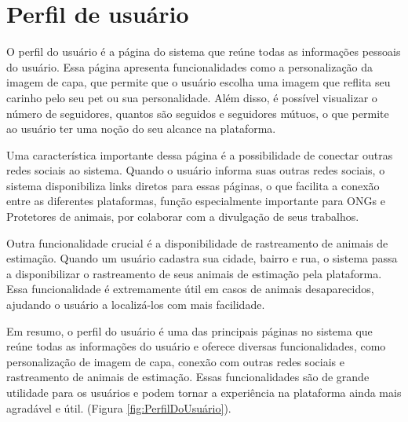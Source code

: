 \newpage
\section{Perfil de usuário}
\label{sec:PerfilDeUsuario}
O perfil do usuário é a página do sistema que reúne todas as informações pessoais do usuário. Essa página apresenta funcionalidades como a personalização da imagem de capa, que permite que o usuário escolha uma imagem que reflita seu carinho pelo seu pet ou sua personalidade. Além disso, é possível visualizar o número de seguidores, quantos são seguidos e seguidores mútuos, o que permite ao usuário ter uma noção do seu alcance na plataforma.

Uma característica importante dessa página é a possibilidade de conectar outras redes sociais ao sistema. Quando o usuário informa suas outras redes sociais, o sistema disponibiliza links diretos para essas páginas, o que facilita a conexão entre as diferentes plataformas, função especialmente importante para ONGs e Protetores de animais, por colaborar com a divulgação de seus trabalhos.

Outra funcionalidade crucial é a disponibilidade de rastreamento de animais de estimação. Quando um usuário cadastra sua cidade, bairro e rua, o sistema passa a disponibilizar o rastreamento de seus animais de estimação pela plataforma. Essa funcionalidade é extremamente útil em casos de animais desaparecidos, ajudando o usuário a localizá-los com mais facilidade.

\newpage
Em resumo, o perfil do usuário é uma das principais páginas no sistema que reúne todas as informações do usuário e oferece diversas funcionalidades, como personalização de imagem de capa, conexão com outras redes sociais e rastreamento de animais de estimação. Essas funcionalidades são de grande utilidade para os usuários e podem tornar a experiência na plataforma ainda mais agradável e útil. (Figura \ref{fig:PerfilDoUsuário}).


